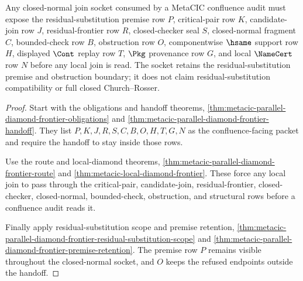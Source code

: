\begin{theorem}
\label{thm:metacic-parallel-diamond-frontier-closed-normal-join-socket}
Any closed-normal join socket consumed by a MetaCIC confluence audit must expose the residual-substitution premise row $P$, critical-pair row $K$, candidate-join row $J$, residual-frontier row $R$, closed-checker seal $S$, closed-normal fragment $C$, bounded-check row $B$, obstruction row $O$, componentwise $\hsame$ support row $H$, displayed $\Cont$ replay row $T$, $\Pkg$ provenance row $G$, and local $\NameCert$ row $N$ before any local join is read. The socket retains the residual-substitution premise and obstruction boundary; it does not claim residual-substitution compatibility or full closed Church--Rosser.
\end{theorem}
\begin{proof}
Start with the obligations and handoff theorems, \autoref{thm:metacic-parallel-diamond-frontier-obligations} and \autoref{thm:metacic-parallel-diamond-frontier-handoff}. They list $P,K,J,R,S,C,B,O,H,T,G,N$ as the confluence-facing packet and require the handoff to stay inside those rows.

Use the route and local-diamond theorems, \autoref{thm:metacic-parallel-diamond-frontier-route} and \autoref{thm:metacic-local-diamond-frontier}. These force any local join to pass through the critical-pair, candidate-join, residual-frontier, closed-checker, closed-normal, bounded-check, obstruction, and structural rows before a confluence audit reads it.

Finally apply residual-substitution scope and premise retention, \autoref{thm:metacic-parallel-diamond-frontier-residual-substitution-scope} and \autoref{thm:metacic-parallel-diamond-frontier-premise-retention}. The premise row $P$ remains visible throughout the closed-normal socket, and $O$ keeps the refused endpoints outside the handoff.
\end{proof}

